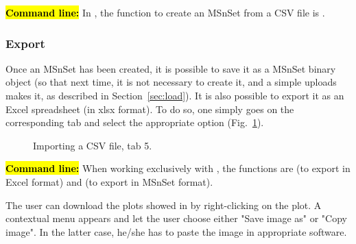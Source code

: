 \documentclass[12pt]{article}
\begin{document}
\hl{\bf Command line:} In , the function to create an MSnSet 
from a CSV file is .


\subsubsection{Export}
Once an MSnSet has been created, it is possible to save it as a MSnSet binary 
object (so that next time, it is not necessary to create it, and a simple 
uploads makes it, as described in Section~\ref{sec:load}). It is also possible 
to export it as an Excel spreadsheet (in xlsx format). To do so, one simply goes on the 
corresponding tab and select the appropriate option (Fig.~\ref{fig:export}).


\begin {figure}
\centering
{}
\caption{Importing a CSV file, tab 5.}\label{fig:export}
\end {figure}




\hl{\bf Command line:} When working exclusively with , the 
functions are  (to export in Excel format) 
and  (to export in MSnSet format).


{The user can download the plots showed in  by 
right-clicking on the plot. A contextual menu appears and let the user 
choose either "Save image as" or "Copy image". In the latter case, he/she has 
to paste the image in appropriate software.}
\end{document}
